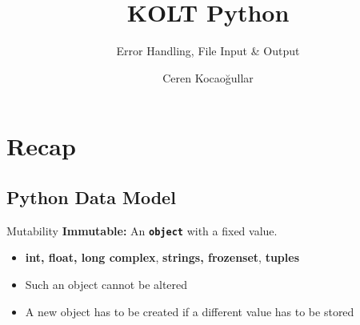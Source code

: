 
\usepackage{../KU-Beamer-Template/style/koc} 
\usepackage{minted}
\usepackage{upquote}
\usepackage{graphicx}
\usepackage{tikz}
\usetikzlibrary{shapes.symbols,positioning, chains}

\title{KOLT Python}
\subtitle{Error Handling, File Input \& Output} 
\date{}
\author{Ceren Kocaoğullar}




    \maketitle


    \section{Recap}
        \subsection{Python Data Model}


\begin{frame}{Mutability}
        \huge
        \textbf{Immutable:}
        \LARGE
        An \texttt{\textbf{object}} with a fixed value.
        \begin{itemize}
             \item \textbf{int, float, long complex}, \textbf{strings, frozenset}, \textbf{tuples}
            \item Such an object cannot be altered
            \item A new object has to be created if a different value has to be stored
        \end{itemize}
       
\end{frame}
    
